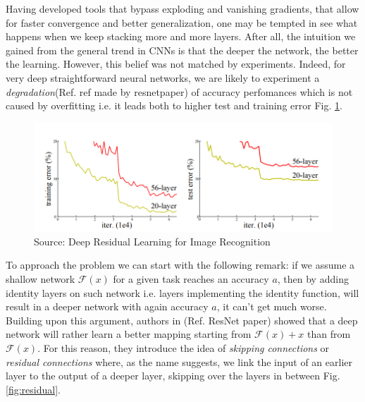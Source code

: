 \documentclass[LaM,binding=0.6cm]{./packages/sapthesis/sapthesis}
\begin{document}
        Having developed tools that bypass exploding and vanishing gradients, that allow for faster convergence
        and better generalization, one may be tempted in see what happens when we keep stacking more and more layers.
        After all, the intuition we gained from the general trend in CNNs is that the deeper the network, the better
        the learning. However, this belief was not matched by experiments. Indeed, for very deep 
        straightforward neural networks, we are likely to experiment a \textit{degradation}(Ref. ref made by resnetpaper) of accuracy perfomances
        which is not caused by overfitting i.e. it leads both to higher test and training error Fig. \ref{fig:degradation}.
        \begin{figure}[h]
            \centering
            \includegraphics[scale=0.35]{degradation}
            \caption{Source: Deep Residual Learning for Image Recognition}
            \label{fig:degradation}
        \end{figure}
        To approach the problem we can start with the following remark: if we assume a shallow
        network $ \mathcal{F} (x) $ for a given task reaches an accuracy $a$, then by adding identity layers on such network i.e. layers implementing the identity function,
        will result in a deeper network with again accuracy $a$, it can't get much worse.
        Building upon this argument, authors in (Ref. ResNet paper) showed that a deep network will rather
        learn a better mapping starting from $ \mathcal{F} (x) + x $ than from $ \mathcal{F} (x) $. 
        For this reason, they introduce the idea of \textit{skipping connections} or \textit{residual connections} where, 
        as the name suggests, we link the input of an earlier layer to the output of a deeper layer, skipping
        over the layers in between Fig. \ref{fig:residual}.
\end{document}

